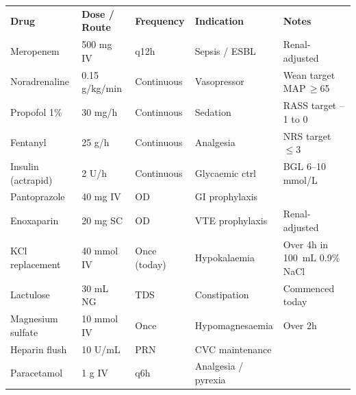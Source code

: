 \documentclass[11pt,a4paper]{scrartcl}
\begin{document}
\noindent
\begin{tcolorbox}[sectionbox, title={\faPills\enspace Active Medication Chart}]
  \footnotesize\sffamily
  \renewcommand{\arraystretch}{1.35}
  \begin{tabularx}{\linewidth}{@{}p{3.6cm}p{2.8cm}p{2.2cm}p{2.0cm}X@{}}
    \rowcolor{MedNavy}
    \textbf{\color{white}Drug} &
    \textbf{\color{white}Dose / Route} &
    \textbf{\color{white}Frequency} &
    \textbf{\color{white}Indication} &
    \textbf{\color{white}Notes} \\
    \rowcolor{MedLight}
    Meropenem & 500 mg IV & q12h & Sepsis / ESBL & Renal-adjusted \\
    Noradrenaline & 0.15 \textmu{}g/kg/min & Continuous & Vasopressor & Wean target MAP\,$\geq$65 \\
    \rowcolor{MedLight}
    Propofol 1\% & 30 mg/h & Continuous & Sedation & RASS target --1 to 0 \\
    Fentanyl & 25 \textmu{}g/h & Continuous & Analgesia & NRS target $\leq$3 \\
    \rowcolor{MedLight}
    Insulin (actrapid) & 2 U/h & Continuous & Glycaemic ctrl & BGL 6--10 mmol/L \\
    Pantoprazole & 40 mg IV & OD & GI prophylaxis & \\
    \rowcolor{MedLight}
    Enoxaparin & 20 mg SC & OD & VTE prophylaxis & Renal-adjusted \\
    KCl replacement & 40 mmol IV & Once (today) & Hypokalaemia & Over 4h in 100~mL 0.9\% NaCl \\
    \rowcolor{MedLight}
    Lactulose & 30 mL NG & TDS & Constipation & Commenced today \\
    Magnesium sulfate & 10 mmol IV & Once & Hypomagnesaemia & Over 2h \\
    \rowcolor{MedLight}
    Heparin flush & 10 U/mL & PRN & CVC maintenance & \\
    Paracetamol & 1 g IV & q6h & Analgesia / pyrexia & \\
  \end{tabularx}
\end{tcolorbox}

\vspace{6pt}
\end{document}
